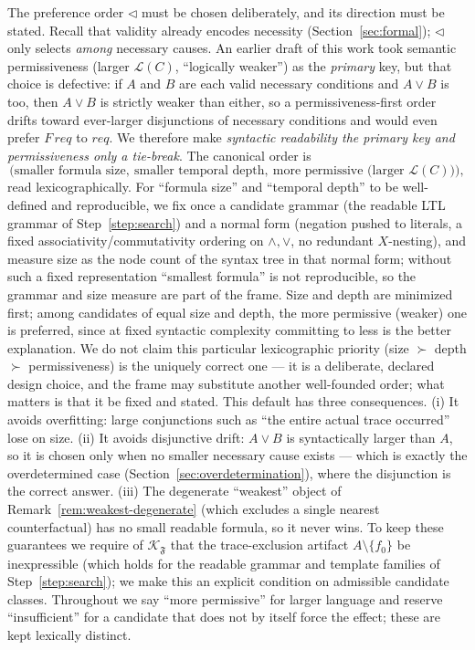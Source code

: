 \documentclass[11pt]{article}
\theoremstyle{remark}
\newcommand{\Lang}{\mathcal{L}}
\newcommand{\Frame}{\mathfrak{F}}
\begin{document}
The preference order \(\triangleleft\) must be chosen deliberately, and its
direction must be stated. Recall that validity already encodes necessity
(Section~\ref{sec:formal}); \(\triangleleft\) only selects \emph{among} necessary
causes. An earlier draft of this work took semantic permissiveness (larger
\(\Lang(C)\), ``logically weaker'') as the \emph{primary} key, but that choice is
defective: if \(A\) and \(B\) are each valid necessary conditions and \(A\lor B\)
is too, then \(A\lor B\) is strictly weaker than either, so a permissiveness-first
order drifts toward ever-larger disjunctions of necessary conditions and would
even prefer \(F\,req\) to \(req\). We therefore make \emph{syntactic readability
the primary key and permissiveness only a tie-break}. The canonical order is
\[
  \bigl(\text{smaller formula size},\ \text{smaller temporal depth},\
  \text{more permissive (larger }\Lang(C)\text{)}\bigr),
\]
read lexicographically. For ``formula size'' and ``temporal depth'' to be
well-defined and reproducible, we fix once a candidate grammar (the readable LTL
grammar of Step~\ref{step:search}) and a normal form (negation pushed to literals,
a fixed associativity/commutativity ordering on \(\land,\lor\), no redundant
\(X\)-nesting), and measure size as the node count of the syntax tree in that
normal form; without such a fixed representation ``smallest formula'' is not
reproducible, so the grammar and size measure are part of the frame. Size and
depth are minimized first; among candidates of equal size and depth, the more
permissive (weaker) one is preferred, since at fixed syntactic complexity
committing to less is the better explanation. We do not claim this particular
lexicographic priority (size \(\succ\) depth \(\succ\) permissiveness) is the
uniquely correct one --- it is a deliberate, declared design choice, and the frame
may substitute another well-founded order; what matters is that it be fixed and
stated. This default has three consequences. (i) It avoids overfitting: large conjunctions such as ``the
entire actual trace occurred'' lose on size. (ii) It avoids disjunctive drift:
\(A\lor B\) is syntactically larger than \(A\), so it is chosen only when no
smaller necessary cause exists --- which is exactly the overdetermined case
(Section~\ref{sec:overdetermination}), where the disjunction is the correct answer.
(iii) The degenerate ``weakest'' object of
Remark~\ref{rem:weakest-degenerate} (which excludes a single nearest
counterfactual) has no small readable formula, so it never wins. To keep these
guarantees we require of \(\mathcal{K}_{\Frame}\) that the trace-exclusion
artifact \(A\setminus\{f_0\}\) be inexpressible (which holds for the readable
grammar and template families of Step~\ref{step:search}); we make this an
explicit condition on admissible candidate classes. Throughout we say ``more
permissive'' for larger language and reserve ``insufficient'' for a candidate
that does not by itself force the effect; these are kept lexically distinct.
\end{document}
